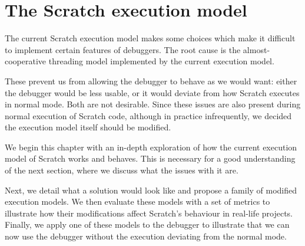 \documentclass[../main]{subfiles}
\begin{document}
\chapter{The Scratch execution model}\label{ch:scratch-execution-model}


The current Scratch execution model makes some choices which make it difficult to implement certain features of debuggers.
The root cause is the almost-cooperative threading model implemented by the current execution model.

These prevent us from allowing the debugger to behave as we would want: either the debugger would be less usable, or it would deviate from how Scratch executes in normal mode.
Both are not desirable.
Since these issues are also present during normal execution of Scratch code, although in practice infrequently, we decided the execution model itself should be modified.

We begin this chapter with an in-depth exploration of how the current execution model of Scratch works and behaves.
This is necessary for a good understanding of the next section, where we discuss what the issues with it are.

Next, we detail what a solution would look like and propose a family of modified execution models.
We then evaluate these models with a set of metrics to illustrate how their modifications affect Scratch's behaviour in real-life projects.
Finally, we apply one of these models to the debugger to illustrate that we can now use the debugger without the execution deviating from the normal mode.
\end{document}
